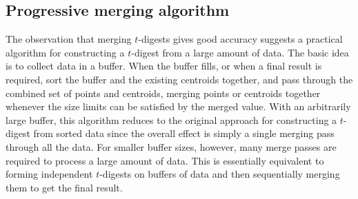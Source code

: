 \documentclass[11pt]{amsart}
\begin{document}
\subsection{Progressive merging algorithm}
The observation that merging $t$-digests gives good accuracy suggests a practical algorithm for constructing a $t$-digest from a large amount of data. The basic idea is to collect data in a buffer. When the buffer fills, or when a final result is required, sort the buffer and the existing centroids together, and pass through the combined set of points and centroids, merging points or centroids together whenever the size limits can be satisfied by the merged value. With an arbitrarily large buffer, this algorithm reduces to the original approach for constructing a $t$-digest from sorted data since the overall effect is simply a single merging pass through all the data. For smaller buffer sizes, however, many merge passes are required to process a large amount of data. This is essentially equivalent to forming independent $t$-digests on buffers of data and then sequentially merging them to get the final result.
\end{document}
